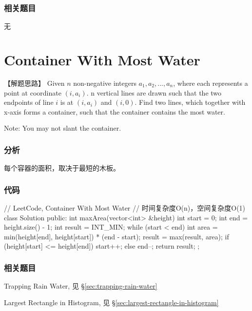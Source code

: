 \subsubsection{相关题目}
\begindot
\item 无
\myenddot


\section{Container With Most Water}
\label{sec:container-with-most-water}


【解题思路】
Given $n$ non-negative integers $a_1, a_2, ..., a_n$, where each represents a point at coordinate $(i, a_i)$. n vertical lines are drawn such that the two endpoints of line $i$ is 
at $(i, a_i)$ and $(i, 0)$. Find two lines, which together with x-axis forms a container, such that the container contains the most water.

Note: You may not slant the container.


\subsubsection{分析}
每个容器的面积，取决于最短的木板。


\subsubsection{代码}
\begin{Code}
	// LeetCode, Container With Most Water
	// 时间复杂度O(n)，空间复杂度O(1)
	class Solution {
		public:
		int maxArea(vector<int> &height) {
			int start = 0;
			int end = height.size() - 1;
			int result = INT_MIN;
			while (start < end) {
				int area = min(height[end], height[start]) * (end - start);
				result = max(result, area);
				if (height[start] <= height[end]) {
					start++;
				} else {
				end--;
			}
		}
		return result;
	}
};
\end{Code}


\subsubsection{相关题目}
\begindot
\item Trapping Rain Water, 见 \S \ref{sec:trapping-rain-water}
\item Largest Rectangle in Histogram, 见 \S \ref{sec:largest-rectangle-in-histogram}
\myenddot
